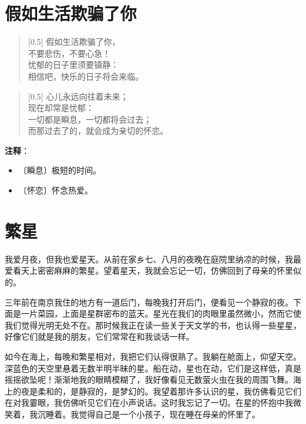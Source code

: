\documentclass[12pt,UTF-8,openany]{ctexbook}
\begin{document}
\chapter{假如生活欺骗了你}

\begin{normalsize}
    
    \begin{verse}[0.5\linewidth]
        假如生活欺骗了你， \\
        不要悲伤，不要心急！ \\
        忧郁的日子里须要镇静： \\
        相信吧，快乐的日子将会来临。
    \end{verse}
    
    
    \begin{verse}[0.5\linewidth]
        心儿永远向往着未来； \\
        现在却常是忧郁： \\
        一切都是瞬息，一切都将会过去； \\
        而那过去了的，就会成为亲切的怀恋。
    \end{verse}
    
\end{normalsize}


\newpage

\textbf{注释}：

\vspace{-1em}

\begin{itemize}
    \setlength\itemsep{-0.2em}
    \item 〔瞬息〕极短的时间。
    \item 〔怀恋〕怀念热爱。
\end{itemize}

\chapter{繁星}

\begin{normalsize}
    
    我爱月夜，但我也爱星天。从前在家乡七、八月的夜晚在庭院里纳凉的时候，我最爱看天上密密麻麻的繁星。望着星天，我就会忘记一切，仿佛回到了母亲的怀里似的。
    
    三年前在南京我住的地方有一道后门，每晚我打开后门，便看见一个静寂的夜。下面是一片菜园，上面是星群密布的蓝天。星光在我们的肉眼里虽然微小，然而它使我们觉得光明无处不在。那时候我正在读一些关于天文学的书，也认得一些星星，好像它们就是我的朋友，它们常常在和我谈话一样。
    
    如今在海上，每晚和繁星相对，我把它们认得很熟了。我躺在舱面上，仰望天空。深蓝色的天空里悬着无数半明半昧的星。船在动，星也在动，它们是这样低，真是摇摇欲坠呢！渐渐地我的眼睛模糊了，我好像看见无数萤火虫在我的周围飞舞。海上的夜是柔和的，是静寂的，是梦幻的。我望着那许多认识的星，我仿佛看见它们在对我霎眼，我仿佛听见它们在小声说话。这时我忘记了一切。在星的怀抱中我微笑着，我沉睡着。我觉得自己是一个小孩子，现在睡在母亲的怀里了。
    
\end{normalsize}
\end{document}
